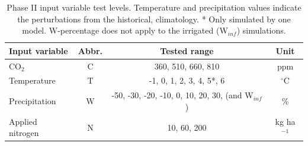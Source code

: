 \documentclass[preprint, 5p, times, twocolumn]{elsarticle}
\begin{document}
\begin{table}[!b]
    \small \centering
    \begin{tabular}[0.75\linewidth]{lccc} 
        \hline \vspace{1mm}
        \textbf{Input variable} & \textbf{Abbr.} & \textbf{Tested range} & \textbf{Unit}\\ \hline \hline \vspace{1mm}
        {CO$_2$}& {C} & {360, 510, 660, 810} & {ppm}\\ \hline \vspace{1mm}
        {Temperature}& {T} & {-1, 0, 1, 2, 3, 4, 5*, 6} & {$^{\circ}$C}\\ \hline \vspace{1mm}
        {Precipitation}& {W} & {-50, -30, -20, -10, 0, 10, 20, 30, (and W$_{inf}$)} & {\%}\\ \hline \vspace{1mm}
        {Applied nitrogen}& {N} & {10, 60, 200} & {kg ha$^{-1}$}\\ \hline
    \end{tabular}\\
    \parbox{11cm}{\caption{Phase II input variable test levels. Temperature and precipitation values indicate the perturbations from the historical, climatology. * Only simulated by one model. W-percentage does not apply to the irrigated (W$_{inf}$) simulations.}}
    \label{table:inputs}
\end{table}

\end{document}
